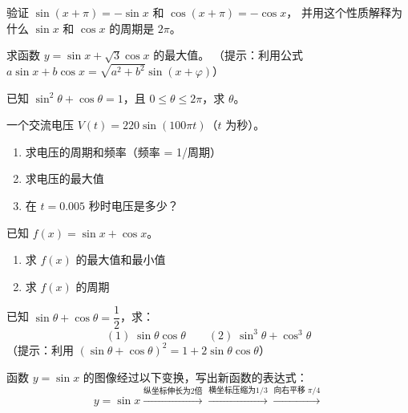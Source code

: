 \begin{exercise}[4]
验证 \(\sin(x + \pi) = -\sin x\) 和 \(\cos(x + \pi) = -\cos x\)，
并用这个性质解释为什么 \(\sin x\) 和 \(\cos x\) 的周期是 \(2\pi\)。
\end{exercise}


\begin{exercise}[5]
求函数 \(y = \sin x + \sqrt{3}\cos x\) 的最大值。
（提示：利用公式 \(a\sin x + b\cos x = \sqrt{a^2 + b^2}\sin(x + \varphi)\)）
\end{exercise}

\begin{exercise}[5]
已知 \(\sin^2 \theta + \cos \theta = 1\)，且 \(0 \le \theta \le 2\pi\)，求 \(\theta\)。
\end{exercise}

\begin{exercise}[5]
一个交流电压 \(V(t) = 220\sin(100\pi t)\)（\(t\) 为秒）。
\begin{enumerate}
  \item[(1)] 求电压的周期和频率（频率 = 1/周期）
  \item[(2)] 求电压的最大值
  \item[(3)] 在 \(t = 0.005\) 秒时电压是多少？
\end{enumerate}
\end{exercise}

\begin{exercise}[5]
已知 \(f(x) = \sin x + \cos x\)。
\begin{enumerate}
  \item[(1)] 求 \(f(x)\) 的最大值和最小值
  \item[(2)] 求 \(f(x)\) 的周期
\end{enumerate}
\end{exercise}


\begin{exercise}[6]
已知 \(\sin \theta + \cos \theta = \dfrac{1}{2}\)，求：
\[
(1)\; \sin \theta \cos \theta \qquad (2)\; \sin^3 \theta + \cos^3 \theta
\]
（提示：利用 \((\sin\theta + \cos\theta)^2 = 1 + 2\sin\theta\cos\theta\)）
\end{exercise}

\begin{exercise}[6]
函数 \(y = \sin x\) 的图像经过以下变换，写出新函数的表达式：
\[
y = \sin x \xrightarrow{\text{纵坐标伸长为2倍}} \xrightarrow{\text{横坐标压缩为1/3}} \xrightarrow{\text{向右平移 }\pi/4}
\]
\end{exercise}

